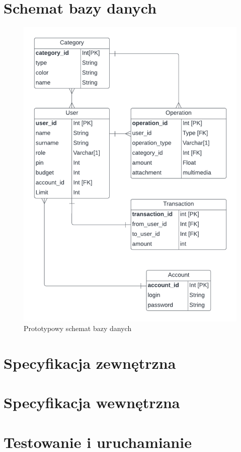 \documentclass[12pt,a4paper,oneside]{article}
\begin{document}
\section{Schemat bazy danych}
\begin{figure}[H]
    \centering
    \includegraphics[width=\hsize,keepaspectratio]{DB1.png}
    \caption{Prototypowy schemat bazy danych}
\end{figure}

\section{Specyfikacja zewnętrzna}

\section{Specyfikacja wewnętrzna}

\section{Testowanie i uruchamianie}
\end{document}
